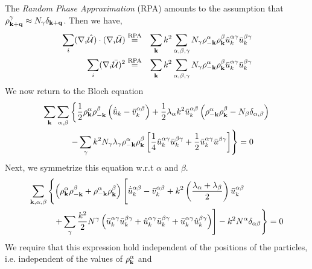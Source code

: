 \documentclass{article}
\begin{document}
The {\em Random Phase Approximation} (RPA) amounts to the assumption
that $\rho^\gamma_{\mathbf{k} + \mathbf{q}} \approx N_\gamma \delta_{\mathbf{k} + \mathbf{q}}$. 
Then we have,
\begin{eqnarray}
\sum_i (\nabla_i \hat{\mathcal{U}}) \cdot ( \nabla_i \bar{\mathcal{U}}
) & \overset{\text{RPA}}{=} &
\sum_{\mathbf{k}} k^2 \sum_{\alpha, \beta, \gamma} N_\gamma \rho^\alpha_{-\mathbf{k}}
\rho^\beta_{\mathbf{k}} \hat{u}^{\alpha \gamma}_k \bar{u}^{\beta \gamma}_k \\
\sum_i (\nabla_i \bar{\mathcal{U}})^2 & \overset{\text{RPA}}{=} &
\sum_{\mathbf{k}} k^2 \sum_{\alpha, \beta, \gamma} N_\gamma
\rho^{\alpha}_{-\mathbf{k}} \rho^\beta_{\mathbf{k}} \bar{u}_k^{\alpha \gamma}
\bar{u}_k^{\beta \gamma}
\end{eqnarray}
We now return to the Bloch equation
\begin{equation}
\begin{split}
\sum_{\mathbf{k}} \sum_{\alpha,\beta} & \left\{ 
\frac{1}{2} \rho_{\mathbf{k}}^\alpha
\rho_{-\mathbf{k}}^\beta \left(\dot{\bar{u}}_k - \bar{v}_k^{\alpha \beta} \right)
+\frac{1}{2} \lambda_\alpha k^2 \bar{u}_k^{\alpha \beta}
\left(\rho_{-\mathbf{k}}^\alpha 
  \rho_{\mathbf{k}}^\beta - N_\beta \delta_{\alpha,\beta} \right) 
\right. \\
& \left. -\sum_\gamma k^2 N_\gamma \lambda_\gamma \rho_{-\mathbf{k}}^\alpha
  \rho_{\mathbf{k}}^\beta \left[ 
\frac{1}{4} \hat{u}^{\alpha \gamma}_k \bar{u}^{\beta\gamma}_k +
\frac{1}{2} \bar{u}^{\alpha \gamma}_k \bar{u}^{\beta \gamma}
\right]\right\} = 0
\end{split}
\end{equation}
Next, we symmetrize this equation w.r.t $\alpha$ and $\beta$.
\begin{equation}
\begin{split}
\sum_{\vk, \alpha, \beta} & \left\{ \left( \rho^\alpha_{\vk} \rho^\beta_{-\vk} 
+ \rho^\alpha_{-\vk} \rho^\beta_{\vk} \right) \left[
\dot{\bar{u}}_k^{\alpha \beta} - \bar{v}_k^{\alpha \beta}
 +k^2 \left(\frac{\lambda_\alpha+\lambda_\beta}{2}\right) 
\bar{u}_k^{\alpha \beta} \rule{0cm}{0.6cm} \right.\right. \\
& \ \ \left.\left.+\sum_\gamma \frac{k^2}{2} N^\gamma \left(
\bar{u}_k^{\alpha \gamma} \bar{u}_k^{\beta \gamma} +
\hat{u}_k^{\alpha \gamma} \bar{u}_k^{\beta \gamma} +
\bar{u}_k^{\alpha \gamma} \hat{u}_k^{\beta \gamma}  \right)
\right]
- k^2 N^\alpha \delta_{\alpha \beta}
\right\} = 0
\end{split}
\end{equation}
We require that this expression hold independent of the positions of
the particles, i.e. independent of the values of $\rho^\alpha_{\mathbf{k}}$ and
\end{document}

